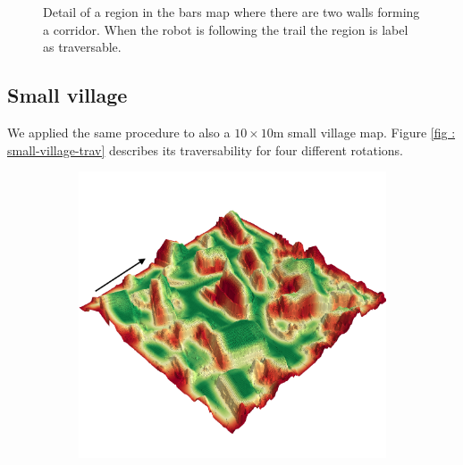 \documentclass[../document.tex]{subfiles}
\begin{document}
\begin{figure} [htbp]
\begin{subfigure}[b]{0.23\textwidth}
  \end{subfigure}
  \caption{Detail of a region in the bars map where there are two walls forming a corridor. When the robot is  following the trail the region is label as traversable.}
  \label{fig : bars-tunnel-trav}
  \end{figure}

\subsection{Small village}
We applied the same procedure to also a $10\times10$m small village map. Figure \ref{fig : small-village-trav} describes its traversability for four different rotations.

\begin{figure} [htbp]
  \centering
  \begin{subfigure}[b]{0.45\textwidth}
    \includegraphics[width=\linewidth]{../img/4/traversability/sullens/-270.png} 
  \end{subfigure}
  \begin{subfigure}[b]{0.45\textwidth}

\end{subfigure}
\end{figure}
\end{document}
